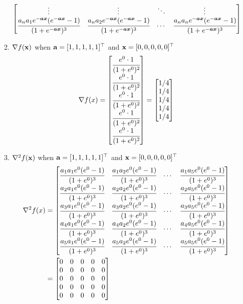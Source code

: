 \documentclass[12pt, fullpage,letterpaper]{article}
\begin{document}
\begin{enumerate}
\begin{enumerate}
\begin{align}
\begin{bmatrix}
\vdots & \vdots & \ddots & \vdots\\
\cfrac{a_na_1e^{-\bm{a}\bm{x}}(e^{-\bm{a}\bm{x}}-1)}{(1+e^{-\bm{a}\bm{x}})^3} & \cfrac{a_na_2e^{-\bm{a}\bm{x}}(e^{-\bm{a}\bm{x}}-1)}{(1+e^{-\bm{a}\bm{x}})^3} & \cdots & \cfrac{a_na_ne^{-\bm{a}\bm{x}}(e^{-\bm{a}\bm{x}}-1)}{(1+e^{-\bm{a}\bm{x}})^3} \\
\end{bmatrix}
\end{align}
\item $\nabla f({\bf x})$ when ${\bf a} = [1,1,1,1,1]^\top$ and ${\bf x} = [0,0,0,0,0]^\top$
\[
\nabla f(x)
=
\begin{bmatrix}
\cfrac{e^0 \cdot 1}{(1 + e^0)^2} \\
\cfrac{e^0 \cdot 1}{(1 + e^0)^2} \\
\cfrac{e^0 \cdot 1}{(1 + e^0)^2} \\
\cfrac{e^0 \cdot 1}{(1 + e^0)^2} \\
\cfrac{e^0 \cdot 1}{(1 + e^0)^2} \\
\end{bmatrix}
=
\begin{bmatrix}
1/4 \\
1/4 \\
1/4 \\
1/4 \\
1/4 \\
\end{bmatrix}
\]
\item $\nabla^2 f({\bf x})$  when ${\bf a} = [1,1,1,1,1]^\top$ and ${\bf x} = [0,0,0,0,0]^\top$
\setcounter{equation}{0}
\begin{align}
\nabla^2 f(x)
&=
\begin{bmatrix}
\cfrac{a_1a_1e^0(e^0-1)}{(1+e^0)^3} & \cfrac{a_1a_2e^0(e^0-1)}{(1+e^0)^3} & \cdots & \cfrac{a_1a_5e^0(e^0-1)}{(1+e^0)^3}\\
\cfrac{a_2a_1e^0(e^0-1)}{(1+e^0)^3} & \cfrac{a_2a_2e^0(e^0-1)}{(1+e^0)^3} & \cdots & \cfrac{a_2a_5e^0(e^0-1)}{(1+e^0)^3}\\
\cfrac{a_3a_1e^0(e^0-1)}{(1+e^0)^3} & \cfrac{a_3a_2e^0(e^0-1)}{(1+e^0)^3} & \cdots & \cfrac{a_3a_5e^0(e^0-1)}{(1+e^0)^3}\\
\cfrac{a_4a_1e^0(e^0-1)}{(1+e^0)^3} & \cfrac{a_4a_2e^0(e^0-1)}{(1+e^0)^3} & \cdots & \cfrac{a_4a_5e^0(e^0-1)}{(1+e^0)^3}\\
\cfrac{a_5a_1e^0(e^0-1)}{(1+e^0)^3} & \cfrac{a_5a_2e^0(e^0-1)}{(1+e^0)^3} & \cdots & \cfrac{a_5a_5e^0(e^0-1)}{(1+e^0)^3}\\
\end{bmatrix}\\
&=
\begin{bmatrix}
0 & 0 & 0 & 0 & 0 \\
0 & 0 & 0 & 0 & 0 \\
0 & 0 & 0 & 0 & 0 \\
0 & 0 & 0 & 0 & 0 \\
0 & 0 & 0 & 0 & 0 \\
\end{bmatrix}
\end{align}
\end{enumerate}


\end{enumerate}
\end{document}
